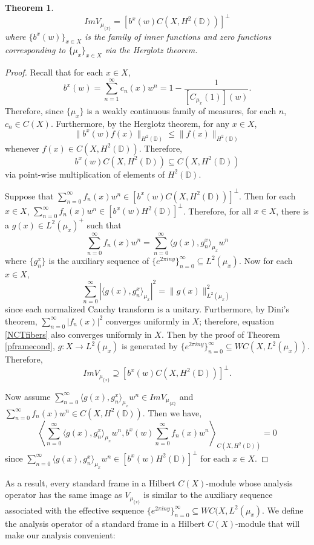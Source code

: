 \documentclass[11pt]{amsart}
\newtheorem{thm}{Theorem}[section]
\theoremstyle{definition}
\numberwithin{equation}{section}
\begin{document}
\begin{thm}\label{imageNCT}
$$ImV_{\mu_{\{x\}}}=[b^{x}(w)C(X, H^{2}(\mathbb{D}))]^{\perp}$$ where $\{b^{x}(w)\}_{x\in X}$ is the family of inner functions and zero functions corresponding to $\{\mu_{x}\}_{x\in X}$ via the Herglotz theorem.
\end{thm}
\begin{proof}
Recall that for each $x\in X$,
$$b^{x}(w)=\sum_{n=1}^{\infty}c_{n}(x)w^{n}=1-\frac{1}{[C_{\mu_{x}}(1)](w)}.$$ Therefore, since $\{\mu_{x}\}$ is a weakly continuous family of measures, for each $n$, $c_{n}\in C(X)$.
Furthermore, by the Herglotz theorem, for any $x\in X$, $$\|b^{x}(w)f(x)\|_{H^{2}(\mathbb{D})}\leq \|f(x)\|_{H^{2}(\mathbb{D})}$$ whenever $f(x)\in C(X, H^{2}(\mathbb{D}))$. Therefore,
$$b^{x}(w)C(X, H^{2}(\mathbb{D}))\subseteq C(X, H^{2}(\mathbb{D}))$$ via point-wise multiplication of elements of $H^{2}(\mathbb{D})$.

Suppose that $\sum_{n=0}^{\infty}f_{n}(x)w^{n}\in [b^{x}(w)C(X, H^{2}(\mathbb{D}))]^{\perp}$. Then for each $x\in X$, $\sum_{n=0}^{\infty}f_{n}(x)w^{n}\in [b^{x}(w)H^{2}(\mathbb{D})]^{\perp}$. Therefore, for all $x\in X$, there is a $g(x)\in L^{2}(\mu_{x})^{+}$ such that
$$\sum_{n=0}^{\infty}f_{n}(x)w^{n}=\sum_{n=0}^{\infty}\langle g(x), g_{n}^{x}\rangle_{\mu_{x}}w^{n}$$ where $\{g_{n}^{x}\}$ is the auxiliary sequence of $\{e^{2\pi i ny}\}_{n=0}^{\infty}\subseteq L^{2}(\mu_{x})$. Now for each $x\in X$,
\begin{equation}\label{NCTfibers}
\sum_{n=0}^{\infty}|\langle g(x), g_{n}^{x}\rangle_{\mu_{x}}|^{2}=\|g(x)\|^{2}_{L^{2}(\mu_{x})}
\end{equation}
since each normalized Cauchy transform is a unitary.
Furthermore, by Dini's theorem, $\sum_{n=0}^{\infty}|f_{n}(x)|^{2}$ converges uniformly in $X$; therefore, equation \ref{NCTfibers} also converges uniformly in $X$. Then by the proof of Theorem \ref{pframecond}, $g: X\to L^{2}(\mu_{x})$ is generated by $\{e^{2\pi i ny}\}_{n=0}^{\infty}\subseteq WC(X, L^{2}(\mu_{x}))$. Therefore, 
$$ImV_{\mu_{\{x\}}}\supseteq[b^{x}(w)C(X, H^{2}(\mathbb{D}))]^{\perp}.$$

Now assume $\sum_{n=0}^{\infty}\langle g(x), g_{n}^{x}\rangle_{\mu_{x}}w^{n}\in ImV_{\mu_{\{x\}}}$ and $\sum_{n=0}^{\infty}f_{n}(x)w^{n}\in C(X, H^{2}(\mathbb{D}))$. Then we have,
$$\left\langle \sum_{n=0}^{\infty}\langle g(x), g_{n}^{x}\rangle_{\mu_{x}}w^{n}, b^{x}(w)\sum_{n=0}^{\infty}f_{n}(x)w^{n} \right\rangle_{C(X, H^{2}(\mathbb{D}))}=0$$ since $\sum_{n=0}^{\infty}\langle g(x), g_{n}^{x}\rangle_{\mu_{x}}w^{n}\in [b^{x}(w)H^{2}(\mathbb{D})]^{\perp}$ for each $x\in X$.
\end{proof}
As a result, every standard frame in a Hilbert $C(X)$-module whose analysis operator has the same image as $V_{\mu_{\{x\}}}$ is similar to the auxiliary sequence associated with the effective sequence $\{e^{2\pi i n y}\}_{n=0}^{\infty}\subseteq WC(X, L^2(\mu_{x})$. We define the analysis operator of a standard frame in a Hilbert $C(X)$-module that will make our analysis convenient:
\end{document}
